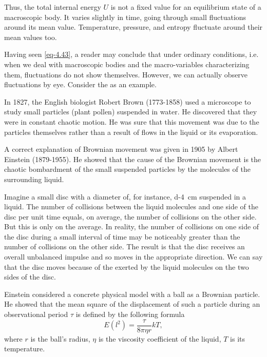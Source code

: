 Thus, the total internal energy $U$ is not a fixed value for an equilibrium state of a macroscopic body. It varies slightly in time, going through small fluctuations around its mean value. Temperature, pressure, and entropy fluctuate around their mean values too.


 Having seen \eqref{eq-4.43}, a reader may conclude that under ordinary conditions, i.e. when we deal with macroscopic bodies and the macro-variables characterizing them, fluctuations do not show themselves. However, we can actually observe fluctuations by eye. Consider the  as an example.

In 1827, the English biologist Robert Brown (1773-1858) used a microscope to study small particles (plant pollen) suspended in water. He discovered that they were in constant chaotic motion. He was sure that this movement was due to the particles themselves rather than a result of flows in the liquid or its evaporation.

A correct explanation of Brownian movement was given in 1905 by Albert Einstein (1879-1955). He showed that the cause of the Brownian movement is the chaotic bombardment of the small suspended particles by the molecules of the surrounding liquid.

Imagine a small disc with a diameter of, for instance, \SI{d-4}{\centi\meter} suspended in a liquid. The number of collisions between the liquid molecules and one side of the disc per unit time equals, on average, the number of collisions on the other side. But this is only on the average. In reality, the number of collisions on one side of the disc during a small interval of time may be noticeably greater than the number of collisions on the other side. The result is that the disc receives an overall unbalanced impulse and so moves in the appropriate direction. We can say that the disc moves because of the  exerted by the liquid molecules on the two sides of the disc.

Einstein considered a concrete physical model with a ball as a Brownian particle. He showed that the mean square of the displacement of such a particle during an observational period $\tau$ is defined by the following formula
\begin{equation}%
E(l^{2}) = \frac{\tau}{8 \pi \eta r} k T,
\label{eq-4.44}
\end{equation}
where $r$ is the ball's radius, $\eta$ is the viscosity coefficient of the liquid, $T$ is its temperature.

